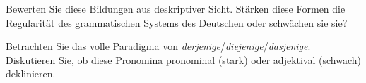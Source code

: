 \begin{sloppypar}
Bewerten Sie diese Bildungen aus deskriptiver Sicht.
Stärken diese Formen die Regularität des grammatischen Systems des Deutschen oder schwächen sie sie?

\Uebung[\tristar] \label{u85} Betrachten Sie das volle Paradigma von \textit{derjenige}\slash \textit{diejenige}\slash \textit{dasjenige}.
Diskutieren Sie, ob diese Pronomina pronominal (stark) oder adjektival (schwach) deklinieren.

\end{sloppypar}
